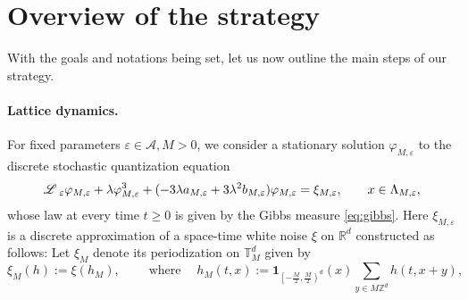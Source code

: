 \documentclass[a4paper,11pt]{article}
\newcommand{\assign}{:=}
\newcommand{\mathd}{\mathrm{d}}
\newcommand{\tmmathbf}[1]{\ensuremath{\boldsymbol{#1}}}
\newcommand{\tmop}[1]{\ensuremath{\operatorname{#1}}}
\numberwithin{equation}{section}
\begin{document}
   


\section{Overview of the strategy}
\label{s:strat}



With the goals and notations being set, let us now outline the main steps of our strategy.

\paragraph{Lattice dynamics.} 




For fixed parameters $\varepsilon \in \mathcal{A}, M > 0$, we consider a stationary
solution $\varphi_{M, \varepsilon}$ to the discrete stochastic quantization
equation
\begin{equation}
  \mathscr{L} \hspace{.2em}_{\varepsilon} \varphi_{M, \varepsilon} + \lambda
  \varphi_{M, \varepsilon}^3 + (- 3 \lambda a_{M, \varepsilon} + 3
  \lambda^2 b_{M, \varepsilon}) \varphi_{M, \varepsilon} = \xi_{M,
  \varepsilon}, \qquad x \in \Lambda_{M, \varepsilon}, \label{eq:moll}
\end{equation}
whose law at every time $t \geqslant 0$ is given by the Gibbs measure
{\eqref{eq:gibbs}}.
Here $\xi_{M, \varepsilon}$ is a discrete approximation of
a space-time white noise $\xi$ on $\mathbb{R}^{d}$ constructed as follows: Let $\xi_M$ denote its periodization on $\mathbb{T}^d_M$
given by
\[ \xi_M (h) \assign \xi (h_M), \qquad \tmop{where} \quad h_M (t, x) \assign
   \tmmathbf{1}_{\left[ - \frac{M}{2}, \frac{M}{2} \right)^d} (x) \sum_{y \in
   M\mathbb{Z}^d} h (t, x + y), \]
\end{document}
